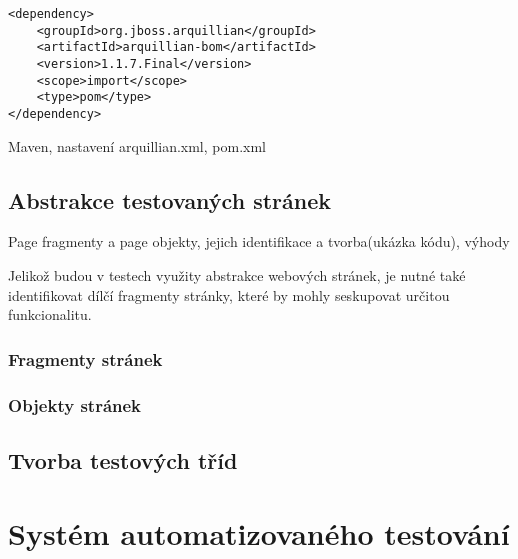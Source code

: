 \documentclass[
    color,   %
	table,   %
    twoside, %
]{fithesis3}
\begin{document}
\begin{lstlisting}
<dependency>
	<groupId>org.jboss.arquillian</groupId>
	<artifactId>arquillian-bom</artifactId>
	<version>1.1.7.Final</version>
	<scope>import</scope>
	<type>pom</type>
</dependency>
\end{lstlisting} 
Maven, nastavení arquillian.xml, pom.xml

\section{Abstrakce testovaných stránek}

Page fragmenty a page objekty, jejich identifikace a tvorba(ukázka kódu), výhody

Jelikož budou v testech využity abstrakce webových stránek, je nutné také identifikovat dílčí fragmenty stránky, které by mohly seskupovat určitou funkcionalitu.

\subsection{Fragmenty stránek}
\subsection{Objekty stránek}

\section{Tvorba testových tříd}

\chapter{Systém automatizovaného testování}
\end{document}
